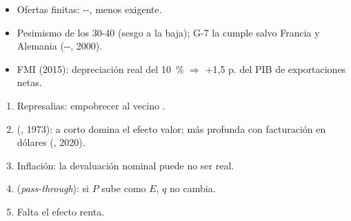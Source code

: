 \documentclass{article}
\begin{document}
\begin{columnas}
\begin{itemize}
  \begin{itemize}
  \item Ej.: $X=80$, $qM=100$, elasticidades 0,5: 0,9 < 1~en €; 1,125 > 1~en divisas.
  \end{itemize}
\item Ofertas finitas: --, menos exigente.
\end{itemize}
\begin{itemize}
\item Pesimismo de los 30-40 (sesgo a la baja); G-7 la cumple salvo Francia y Alemania (--, 2000).
\item FMI (2015): depreciación real del 10~\% $\Rightarrow$ +1,5 p. del PIB de exportaciones netas.
\end{itemize}
\begin{enumerate}
\item Represalias: empobrecer al vecino .
\item {} (, 1973): a corto domina el efecto valor; más profunda con facturación en dólares (, 2020).
\item Inflación: la devaluación nominal puede no ser real.
\item {} (\emph{pass-through}): si $P$ sube como $E$, $q$ no cambia.
\item Falta el efecto renta.
\end{enumerate}


\end{columnas}
\end{document}
